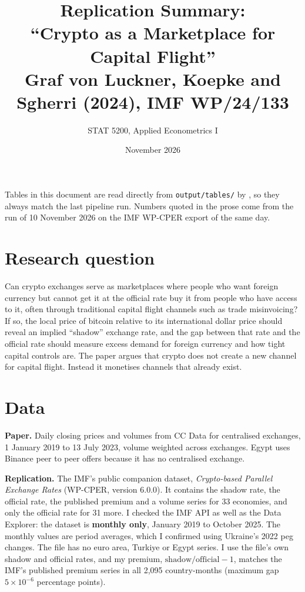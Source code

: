 \documentclass[11pt]{article}
\title{Replication Summary:\\ ``Crypto as a Marketplace for Capital Flight''\\
\large Graf von Luckner, Koepke and Sgherri (2024), IMF WP/24/133}
\author{STAT 5200, Applied Econometrics I}
\date{November 2026}
\begin{document}
\maketitle

\noindent Tables in this document are read directly from \texttt{output/tables/} by \verb||, so they always match the last pipeline run. Numbers quoted in the prose come from the run of 10 November 2026 on the IMF WP-CPER export of the same day.

\section{Research question}

Can crypto exchanges serve as marketplaces where people who want foreign currency but cannot get it at the official rate buy it from people who have access to it, often through traditional capital flight channels such as trade misinvoicing? If so, the local price of bitcoin relative to its international dollar price should reveal an implied ``shadow'' exchange rate, and the gap between that rate and the official rate should measure excess demand for foreign currency and how tight capital controls are. The paper argues that crypto does not create a new channel for capital flight. Instead it monetises channels that already exist.

\section{Data}

\textbf{Paper.} Daily closing prices and volumes from CC Data for centralised exchanges, 1 January 2019 to 13 July 2023, volume weighted across exchanges. Egypt uses Binance peer to peer offers because it has no centralised exchange.

\textbf{Replication.} The IMF's public companion dataset, \emph{Crypto-based Parallel Exchange Rates} (WP-CPER, version 6.0.0). It contains the shadow rate, the official rate, the published premium and a volume series for 33 economies, and only the official rate for 31 more. I checked the IMF API as well as the Data Explorer: the dataset is \textbf{monthly only}, January 2019 to October 2025. The monthly values are period averages, which I confirmed using Ukraine's 2022 peg changes. The file has no euro area, Turkiye or Egypt series. I use the file's own shadow and official rates, and my premium, $\text{shadow}/\text{official} - 1$, matches the IMF's published premium series in all 2,095 country-months (maximum gap $5\times10^{-6}$ percentage points).
\end{document}
